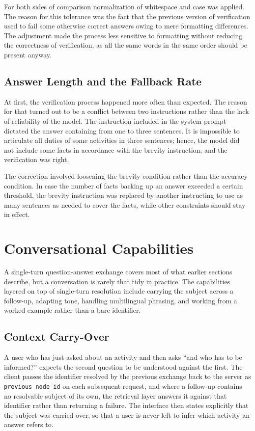 For both sides of comparison normalization of whitespace and case was applied. The reason for this tolerance was the fact that the previous version of verification used to fail some otherwise correct answers owing to mere formatting differences. The adjustment made the process less sensitive to formatting without reducing the correctness of verification, as all the same words in the same order should be present anyway.

\subsection{Answer Length and the Fallback Rate}

At first, the verification process happened more often than expected. The reason for that turned out to be a conflict between two instructions rather than the lack of reliability of the model. The instruction included in the system prompt dictated the answer containing from one to three sentences. It is impossible to articulate all duties of some activities in three sentences; hence, the model did not include some facts in accordance with the brevity instruction, and the verification was right.

The correction involved loosening the brevity condition rather than the accuracy condition. In case the number of facts backing up an answer exceeded a certain threshold, the brevity instruction was replaced by another instructing to use as many sentences as needed to cover the facts, while other constraints should stay in effect.

\section{Conversational Capabilities}

A single-turn question-answer exchange covers most of what earlier sections describe, but a
conversation is rarely that tidy in practice. The capabilities layered on top of single-turn
resolution include carrying the subject across a follow-up, adapting tone, handling
multilingual phrasing, and working from a worked example rather than a bare identifier.

\subsection{Context Carry-Over}

A user who has just asked about an activity and then asks ``and who has to be informed?''
expects the second question to be understood against the first. The client passes the
identifier resolved by the previous exchange back to the server as
\texttt{previous\_node\_id} on each subsequent request, and where a follow-up contains no
resolvable subject of its own, the retrieval layer answers it against that identifier
rather than returning a failure. The interface then states explicitly that the subject was
carried over, so that a user is never left to infer which activity an answer refers to.

